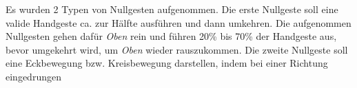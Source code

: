 Es wurden 2 Typen von Nullgesten aufgenommen. Die erste Nullgeste soll eine valide Handgeste ca. zur Hälfte ausführen und dann umkehren. Die aufgenommen Nullgesten gehen dafür \textit{Oben} rein und führen
20\% bis 70\% der Handgeste aus, bevor umgekehrt wird, um \textit{Oben} wieder rauszukommen. Die zweite Nullgeste soll eine Eckbewegung bzw. Kreisbewegung darstellen, indem bei einer Richtung eingedrungen
